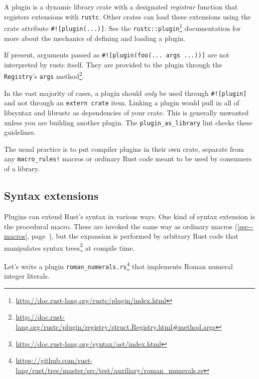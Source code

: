 \documentclass[a4paper,]{book}
\renewcommand*{\hyperref}[2][\ar]{%
  \def\ar{#2}%
  #2 (\autoref{#1}, page~\pageref{#1})}
\renewcommand{\href}[2]{#2\footnote{\url{#1}}}
\begin{document}
A plugin is a dynamic library crate with a designated \emph{registrar}
function that registers extensions with \texttt{rustc}. Other crates can
load these extensions using the crate attribute
\texttt{\#!{[}plugin(...){]}}. See the
\href{http://doc.rust-lang.org/rustc/plugin/index.html}{\texttt{rustc::plugin}}
documentation for more about the mechanics of defining and loading a
plugin.

If present, arguments passed as
\texttt{\#!{[}plugin(foo(...\ args\ ...)){]}} are not interpreted by
rustc itself. They are provided to the plugin through the
\texttt{Registry}'s
\href{http://doc.rust-lang.org/rustc/plugin/registry/struct.Registry.html\#method.args}{\texttt{args}
method}.

In the vast majority of cases, a plugin should \emph{only} be used
through \texttt{\#!{[}plugin{]}} and not through an
\texttt{extern\ crate} item. Linking a plugin would pull in all of
libsyntax and librustc as dependencies of your crate. This is generally
unwanted unless you are building another plugin. The
\texttt{plugin\_as\_library} lint checks these guidelines.

The usual practice is to put compiler plugins in their own crate,
separate from any \texttt{macro\_rules!} macros or ordinary Rust code
meant to be used by consumers of a library.

\subsection{Syntax extensions}\label{syntax-extensions}

Plugins can extend Rust's syntax in various ways. One kind of syntax
extension is the procedural macro. These are invoked the same way as
\hyperref[sec--macros]{ordinary macros}, but the expansion is performed
by arbitrary Rust code that manipulates
\href{http://doc.rust-lang.org/syntax/ast/index.html}{syntax trees} at
compile time.

Let's write a plugin
\href{https://github.com/rust-lang/rust/tree/master/src/test/auxiliary/roman_numerals.rs}{\texttt{roman\_numerals.rs}}
that implements Roman numeral integer literals.
\end{document}

